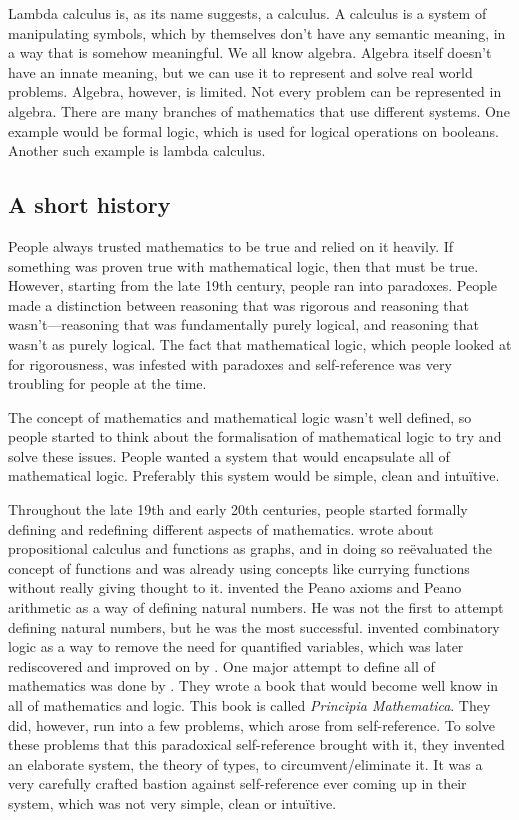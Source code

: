 \documentclass[11pt]{article}
\begin{document}
Lambda calculus is, as its name suggests, a calculus. A calculus is a system of
manipulating symbols, which by themselves don't have any semantic meaning, in a
way that is somehow meaningful. We all know algebra. Algebra itself doesn't
have an innate meaning, but we can use it to represent and solve real world
problems. Algebra, however, is limited. Not every problem can be represented in
algebra. There are many branches of mathematics that use different systems.
One example would be formal logic, which is used for logical operations on
booleans. Another such example is lambda calculus.

\subsection{A short history\label{history}}

People always trusted mathematics to be true and relied on it heavily. If
something was proven true with mathematical logic, then that must be true.
However, starting from the late 19th century, people ran into paradoxes. People
made a distinction between reasoning that was rigorous and reasoning that
wasn't---reasoning that was fundamentally purely logical, and reasoning that
wasn't as purely logical. The fact that mathematical logic, which people looked
at for rigorousness, was infested with paradoxes and self-reference was very
troubling for people at the time.

The concept of mathematics and mathematical logic wasn't well defined, so
people started to think about the formalisation of mathematical logic to try
and solve these issues. People wanted a system that would encapsulate all of
mathematical logic. Preferably this system would be simple, clean and
intuïtive.

Throughout the late 19th and early 20th centuries, people started formally
defining and redefining different aspects of mathematics. \textcite{frege1879}
wrote about propositional calculus and functions as graphs, and in doing so
reëvaluated the concept of functions and was already using concepts like
currying functions without really giving thought to it. \textcite{peano1889}
invented the Peano axioms and Peano arithmetic as a way of defining natural
numbers. He was not the first to attempt defining natural numbers, but he was
the most successful. \textcite{schonfinkel1924} invented combinatory logic as a
way to remove the need for quantified variables, which was later rediscovered
and improved on by \textcite{curry1930}. One major attempt to define all of
mathematics was done by \textcite{russell1997}. They wrote a book that would
become well know in all of mathematics and logic. This book is called
\emph{Principia Mathematica}. They did, however, run into a few problems, which
arose from self-reference. To solve these problems that this paradoxical
self-reference brought with it, they invented an elaborate system, the theory
of types, to circumvent/eliminate it. It was a very carefully crafted bastion
against self-reference ever coming up in their system, which was not very
simple, clean or intuïtive.
\end{document}
